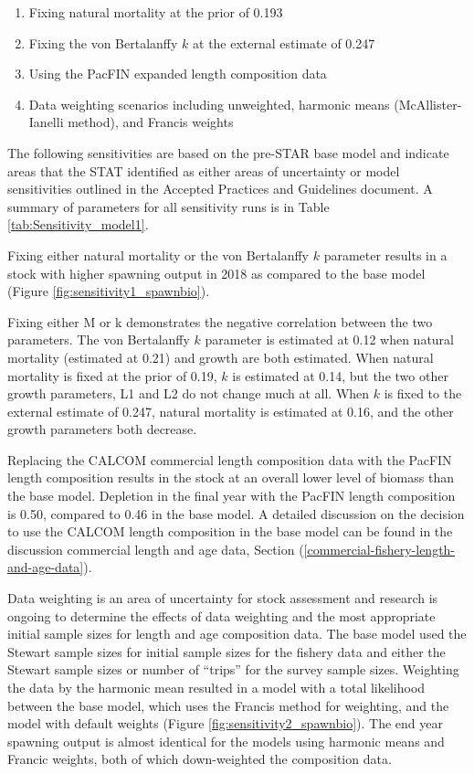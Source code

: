 \documentclass[12pt,]{article}
\begin{document}
\begin{enumerate}

  \item Fixing natural mortality at the prior of 0.193
  
  \item Fixing the von Bertalanffy $k$ at the external estimate of 0.247
  
  \item Using the PacFIN expanded length composition data
  
  \item Data weighting scenarios including unweighted, harmonic means (McAllister-Ianelli method), and Francis weights

\end{enumerate}

The following sensitivities are based on the pre-STAR base model and
indicate areas that the STAT identified as either areas of uncertainty
or model sensitivities outlined in the Accepted Practices and Guidelines
document. A summary of parameters for all sensitivity runs is in Table
\ref{tab:Sensitivity_model1}.

Fixing either natural mortality or the von Bertalanffy \(k\) parameter
results in a stock with higher spawning output in 2018 as compared to
the base model (Figure \ref{fig:sensitivity1_spawnbio}).

Fixing either M or k demonstrates the negative correlation between the
two parameters. The von Bertalanffy \(k\) parameter is estimated at 0.12
when natural mortality (estimated at 0.21) and growth are both
estimated. When natural mortality is fixed at the prior of 0.19, \(k\)
is estimated at 0.14, but the two other growth parameters, L1 and L2 do
not change much at all. When \(k\) is fixed to the external estimate of
0.247, natural mortality is estimated at 0.16, and the other growth
parameters both decrease.

Replacing the CALCOM commercial length composition data with the PacFIN
length composition results in the stock at an overall lower level of
biomass than the base model. Depletion in the final year with the PacFIN
length composition is 0.50, compared to 0.46 in the base model. A
detailed discussion on the decision to use the CALCOM length composition
in the base model can be found in the discussion commercial length and
age data, Section (\ref{commercial-fishery-length-and-age-data}).

Data weighting is an area of uncertainty for stock assessment and
research is ongoing to determine the effects of data weighting and the
most appropriate initial sample sizes for length and age composition
data. The base model used the Stewart sample sizes for initial sample
sizes for the fishery data and either the Stewart sample sizes or number
of ``trips'' for the survey sample sizes. Weighting the data by the
harmonic mean resulted in a model with a total likelihood between the
base model, which uses the Francis method for weighting, and the model
with default weights (Figure \ref{fig:sensitivity2_spawnbio}). The end
year spawning output is almost identical for the models using harmonic
means and Francic weights, both of which down-weighted the composition
data.
\end{document}
